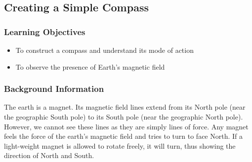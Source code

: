 

\subsection{Creating a Simple Compass}

\subsubsection*{Learning Objectives}
\begin{itemize}
\item{To construct a compass and understand its mode of action}
\item{To observe the presence of Earth's magnetic field} 
\end{itemize}

\subsubsection*{Background Information}
The earth is a magnet.  Its magnetic field lines extend from its North pole (near the geographic South pole) to its South pole (near the geographic North pole).  However, we cannot see these lines as they are simply lines of force.
Any magnet feels the force of the earth's magnetic field and tries to turn to face North.  If a light-weight magnet is allowed to rotate freely, it will turn, thus showing the direction of North and South.

